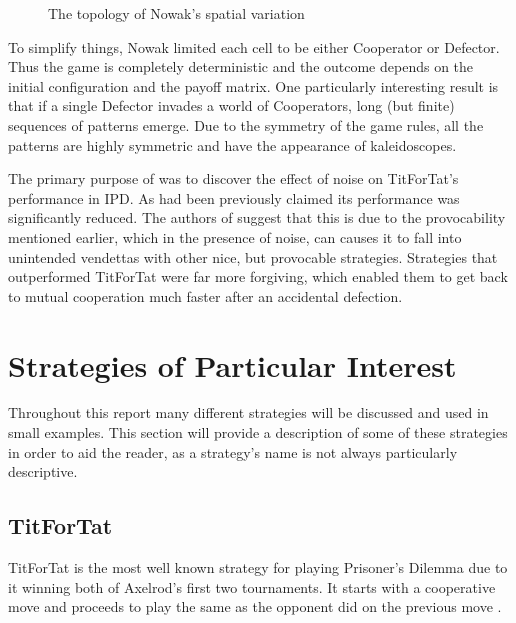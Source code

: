 \begin{figure}[hbtp!]
\centering
{}
\caption{The topology of Nowak's spatial variation}
\label{fig:nowak_spatial}
\end{figure}

To simplify things, Nowak limited each cell to be either Cooperator or Defector.
Thus the game is completely deterministic and the outcome depends on the initial configuration and the payoff matrix.
One particularly interesting result is that if a single Defector invades a world of Cooperators, long (but finite) sequences of patterns emerge.
Due to the symmetry of the game rules, all the patterns are highly symmetric and have the appearance of kaleidoscopes.

The primary purpose of \cite{Bendor1991} was to discover the effect of noise on TitForTat's performance in IPD.
As had been previously claimed its performance was significantly reduced.
The authors of \cite{Bendor1991} suggest that this is due to the provocability mentioned earlier, which in the presence of noise, can causes it to fall into unintended vendettas with other nice, but provocable strategies.
Strategies that outperformed TitForTat were far more forgiving, which enabled them to get back to mutual cooperation much faster after an accidental defection.



\section{Strategies of Particular Interest}\label{sec:individual_strategies}
Throughout this report many different strategies will be discussed and used in small examples.
This section will provide a description of some of these strategies in order to aid the reader, as a strategy's name is not always particularly descriptive.

\subsection{TitForTat}\label{ssec:stra_titfortat}
TitForTat is the most well known strategy for playing Prisoner's Dilemma due to it winning both of Axelrod's first two tournaments.
It starts with a cooperative move and proceeds to play the same as the opponent did on the previous move \cite{Axelrod1980b, Heap2003}.

